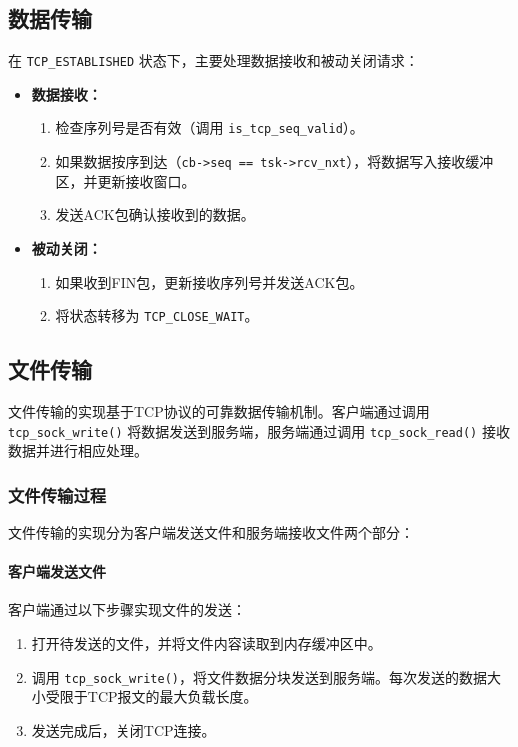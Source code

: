 \documentclass[11pt]{article}
\begin{document}
\subsection{数据传输}
在 \texttt{TCP\_ESTABLISHED} 状态下，主要处理数据接收和被动关闭请求：
\begin{itemize}
    \item \textbf{数据接收：}
    \begin{enumerate}
        \item 检查序列号是否有效（调用 \texttt{is\_tcp\_seq\_valid}）。
        \item 如果数据按序到达（\texttt{cb->seq == tsk->rcv\_nxt}），将数据写入接收缓冲区，并更新接收窗口。
        \item 发送ACK包确认接收到的数据。
    \end{enumerate}
    \item \textbf{被动关闭：}
    \begin{enumerate}
        \item 如果收到FIN包，更新接收序列号并发送ACK包。
        \item 将状态转移为 \texttt{TCP\_CLOSE\_WAIT}。
    \end{enumerate}
\end{itemize}

\subsection{文件传输}
文件传输的实现基于TCP协议的可靠数据传输机制。客户端通过调用 \texttt{tcp\_sock\_write()} 将数据发送到服务端，服务端通过调用 \texttt{tcp\_sock\_read()} 接收数据并进行相应处理。

\subsubsection{文件传输过程}
文件传输的实现分为客户端发送文件和服务端接收文件两个部分：

\paragraph{客户端发送文件}
客户端通过以下步骤实现文件的发送：
\begin{enumerate}
    \item 打开待发送的文件，并将文件内容读取到内存缓冲区中。
    \item 调用 \texttt{tcp\_sock\_write()}，将文件数据分块发送到服务端。每次发送的数据大小受限于TCP报文的最大负载长度。
    \item 发送完成后，关闭TCP连接。
\end{enumerate}
\end{document}
